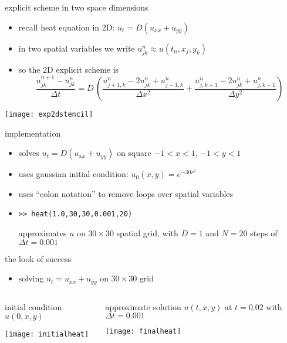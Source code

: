 \begin{frame}{explicit scheme in two space dimensions}

\begin{itemize}
\item recall heat equation in 2D: $u_t = D(u_{xx} + u_{yy})$
\item in two spatial variables we write $u_{jk}^n \approx u(t_n,x_j,y_k)$
\item so the 2D explicit scheme is
\small
	$$\frac{u_{jk}^{n+1} - u_{jk}^n}{\Delta t} = D\,\left(\frac{u_{j+1,k}^n - 2 u_{jk}^n + u_{j-1,k}^n}{\Delta x^2} + \frac{u_{j,k+1}^n - 2 u_{jk}^n + u_{j,k-1}^n}{\Delta y^2}\right)$$
\end{itemize}

\bigskip
\begin{center}
\texttt{[image: exp2dstencil]}
\end{center}
\end{frame}


\begin{frame}{implementation}
\label{slide:heatmatlab}


\small
\begin{itemize}
\item solves $u_t = D(u_{xx} + u_{yy})$ on square $-1 < x < 1$, $-1 < y < 1$
\item uses gaussian initial condition: $u_0(x,y) = e^{-30 r^2}$
\item uses ``colon notation'' to remove loops over spatial variables
\item \texttt{>>  heat(1.0,30,30,0.001,20)}

approximates $u$ on $30\times 30$ spatial grid, with $D=1$ and $N=20$ steps of $\Delta t = 0.001$
\end{itemize}
\end{frame}


\begin{frame}{the look of success}

\begin{itemize}
\item solving $u_t = u_{xx} + u_{yy}$ on $30\times 30$ grid
\end{itemize}

\bigskip\bigskip
\begin{columns}
\begin{column}{0.5\textwidth}
initial condition $u(0,x,y)$

\bigskip
\begin{center}
\texttt{[image: initialheat]}
\end{center}
\end{column}
\begin{column}{0.5\textwidth}
approximate solution $u(t,x,y)$ at $t=0.02$ with $\Delta t=0.001$ 

\bigskip
\begin{center}
\texttt{[image: finalheat]}
\end{center}
\end{column}
\end{columns}
\end{frame}


